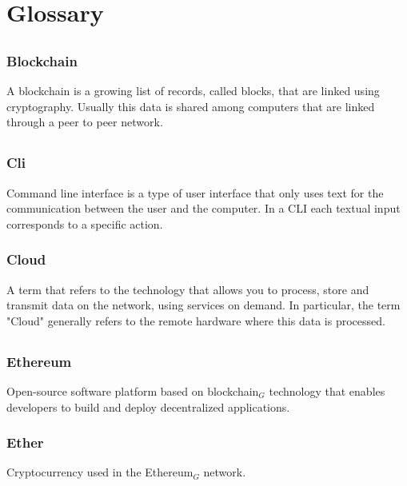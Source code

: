 \section{Glossary}

	\subsection*{}
		\subsubsection*{Blockchain}
			A blockchain is a growing list of records, called blocks, that are linked using cryptography. Usually this data is shared among computers that are linked through a peer to peer network. 

	\subsection*{}
		\subsubsection*{Cli}
			Command line interface is a type of user interface that only uses text for the communication between the user and the computer. In a CLI each textual input corresponds to a specific action.
		
		\subsubsection*{Cloud}
			A term that refers to the technology that allows you to process, store and transmit data on the network, using services on demand. In particular, the term "Cloud" generally refers to the remote hardware where this data is processed.

	\subsection*{}
		\subsubsection*{Ethereum}
			Open-source software platform based on blockchain$_{G}$ technology that enables developers to build and deploy decentralized applications. 
			
		\subsubsection*{Ether}
			Cryptocurrency used in the Ethereum$_{G}$ network. 
	
